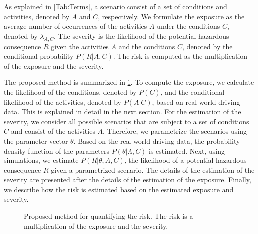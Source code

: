 As explained in \cref{Tab:Terms}, a scenario consist of a set of conditions and activities, denoted by $A$ and $C$, respectively. We formulate the exposure as the average number of occurrences of the activities $A$ under the conditions $C$, denoted by $\lambda_{A,C}$. The severity is the likelihood of the potential hazardous consequence $R$ given the activities $A$ and the conditions $C$, denoted by the conditional probability $P(R|A,C)$. The risk is computed as the multiplication of the exposure and the severity. 

The proposed method is summarized in \cref{fig:method}. To compute the exposure, we calculate the likelihood of the conditions, denoted by $P(C)$, and the conditional likelihood of the activities, denoted by $P(A|C)$, based on real-world driving data. This is explained in detail in the next section. For the estimation of the severity, we consider all possible scenarios that are subject to a set of conditions $C$ and consist of the activities $A$. Therefore, we parametrize the scenarios using the parameter vector $\theta$. Based on the real-world driving data, the probability density function of the parameters $P(\theta|A,C)$ is estimated. Next, using simulations, we estimate $P(R|\theta,A,C)$, the likelihood of a potential hazardous consequence $R$ given a parametrized scenario. The details of the estimation of the severity are presented after the details of the estimation of the exposure. Finally, we describe how the risk is estimated based on the estimated exposure and severity.

\begin{figure}
	\centering
	
	\caption{Proposed method for quantifying the risk. The risk is a multiplication of the exposure and the severity.}
	\label{fig:method}
\end{figure}



